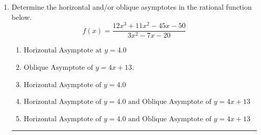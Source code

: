 \documentclass[14pt]{extbook}
\newcommand{\litem}[1]{\item#1\hspace*{-1cm}\rule{\textwidth}{0.4pt}}
\begin{document}
\begin{enumerate}
{\begin{enumerate}[label=\Alph*.]
\end{enumerate} }
\litem{
Determine the horizontal and/or oblique asymptotes in the rational function below.\[ f(x) = \frac{12x^{3} +11 x^{2} -45 x -50}{3x^{2} -7 x -20} \]\begin{enumerate}[label=\Alph*.]
\item \( \text{Horizontal Asymptote at } y = 4.0 \)
\item \( \text{Oblique Asymptote of } y = 4x + 13. \)
\item \( \text{Horizontal Asymptote of } y = 4.0  \)
\item \( \text{Horizontal Asymptote of } y = 4.0 \text{ and Oblique Asymptote of } y = 4x + 13 \)
\item \( \text{Horizontal Asymptote of } y = 4.0 \text{ and Oblique Asymptote of } y = 4x + 13 \)

\end{enumerate} }
\end{enumerate}
\end{document}
